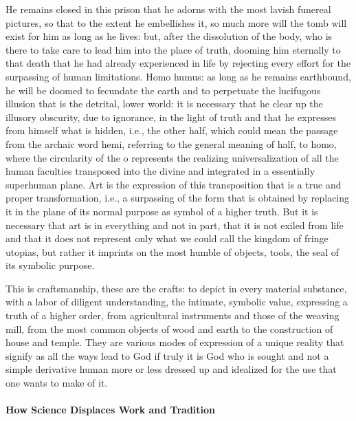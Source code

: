 He remains closed in this prison that he adorns with the most lavish funereal pictures, so that to the extent he embellishes it, so much more will the tomb will exist for him as long as he lives: but, after the dissolution of the body, who is there to take care to lead him into the place of truth, dooming him eternally to that death that he had already experienced in life by rejecting every effort for the surpassing of human limitations. Homo humus: as long as he remains earthbound, he will be doomed to fecundate the earth and to perpetuate the lucifugous illusion that is the detrital, lower world: it is necessary that he clear up the illusory obscurity, due to ignorance, in the light of truth and that he expresses from himself what is hidden, i.e., the other half, which could mean the passage from the archaic word hemi, referring to the general meaning of half, to homo, where the circularity of the o represents the realizing universalization of all the human faculties transposed into the divine and integrated in a essentially superhuman plane. Art is the expression of this transposition that is a true and proper transformation, i.e., a surpassing of the form that is obtained by replacing it in the plane of its normal purpose as symbol of a higher truth. But it is necessary that art is in everything and not in part, that it is not exiled from life and that it does not represent only what we could call the kingdom of fringe utopias, but rather it imprints on the most humble of objects, tools, the seal of its symbolic purpose.

This is craftsmanship, these are the crafts: to depict in every material substance, with a labor of diligent understanding, the intimate, symbolic value, expressing a truth of a higher order, from agricultural instruments and those of the weaving mill, from the most common objects of wood and earth to the construction of house and temple. They are various modes of expression of a unique reality that signify as all the ways lead to God if truly it is God who is sought and not a simple derivative human more or less dressed up and idealized for the use that one wants to make of it.

\paragraph{How Science Displaces Work and Tradition}

